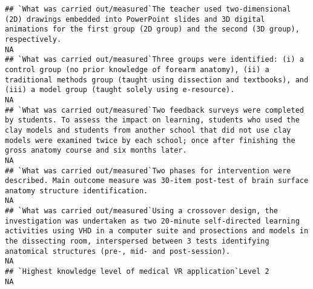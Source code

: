 \documentclass[]{article}
\begin{document}
\begin{verbatim}
## `What was carried out/measured`The teacher used two-dimensional (2D) drawings embedded into PowerPoint slides and 3D digital animations for the first group (2D group) and the second (3D group), respectively.                                                                                                                                                                                                                                                                      NA
## `What was carried out/measured`Three groups were identified: (i) a control group (no prior knowledge of forearm anatomy), (ii) a traditional methods group (taught using dissection and textbooks), and (iii) a model group (taught solely using e-resource).                                                                                                                                                                                                                        NA
## `What was carried out/measured`Two feedback surveys were completed by students. To assess the impact on learning, students who used the clay models and students from another school that did not use clay models were examined twice by each school; once after finishing the gross anatomy course and six months later.                                                                                                                                                            NA
## `What was carried out/measured`Two phases for intervention were described. Main outcome measure was 30-item post-test of brain surface anatomy structure identification.                                                                                                                                                                                                                                                                                                             NA
## `What was carried out/measured`Using a crossover design, the investigation was undertaken as two 20-minute self-directed learning activities using VHD in a computer suite and prosections and models in the dissecting room, interspersed between 3 tests identifying anatomical structures (pre-, mid- and post-session).                                                                                                                                                          NA
## `Highest knowledge level of medical VR application`Level 2                                                                                                                                                                                                                                                                                                                                                                                                                           NA

\end{verbatim}
\end{document}
